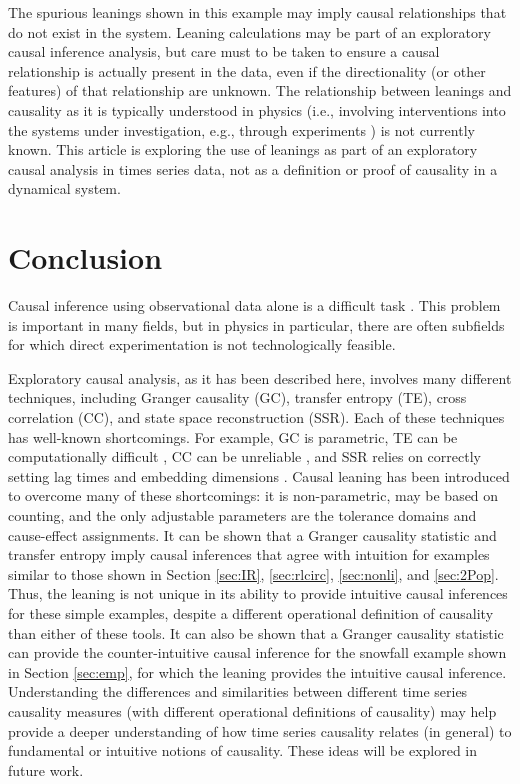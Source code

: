 \documentclass[twocolumn,aps,pre,groupedaddress]{revtex4-1}
\begin{document}
The spurious leanings shown in this example may imply causal relationships that do not exist in the system.  Leaning calculations may be part of an exploratory causal inference analysis, but care must to be taken to ensure a causal relationship is actually present in the data, even if the directionality (or other features) of that relationship are unknown.  The relationship between leanings and causality as it is typically understood in physics (i.e., involving interventions into the systems under investigation, e.g., through experiments \cite{Pearl2000}) is not currently known.  This article is exploring the use of leanings as part of an exploratory causal analysis in times series data, not as a definition or proof of causality in a dynamical system.   

\section{Conclusion}
Causal inference using observational data alone is a difficult task \cite{kleinberg2012}.  This problem is important in many fields, but in physics in particular, there are often subfields for which direct experimentation is not technologically feasible. 

Exploratory causal analysis, as it has been described here, involves many different techniques, including Granger causality (GC), transfer entropy (TE), cross correlation (CC), and state space reconstruction (SSR).  Each of these techniques has well-known shortcomings.  For example, GC is parametric, TE can be computationally difficult \cite{kaiser2002}, CC can be unreliable \cite{Rogosa1980}, and SSR relies on correctly setting lag times and embedding dimensions \cite{Small2004}.  Causal leaning has been introduced to overcome many of these shortcomings: it is non-parametric, may be based on counting, and the only adjustable parameters are the tolerance domains and cause-effect assignments.  It can be shown that a Granger causality statistic and transfer entropy imply causal inferences that agree with intuition for examples similar to those shown in Section \ref{sec:IR}, \ref{sec:rlcirc}, \ref{sec:nonli}, and \ref{sec:2Pop}.  Thus, the leaning is not unique in its ability to provide intuitive causal inferences for these simple examples, despite a different operational definition of causality than either of these tools.  It can also be shown that a Granger causality statistic can provide the counter-intuitive causal inference for the snowfall example shown in Section \ref{sec:emp}, for which the leaning provides the intuitive causal inference.  Understanding the differences and similarities between different time series causality measures (with different operational definitions of causality) may help provide a deeper understanding of how time series causality relates (in general) to fundamental or intuitive notions of causality.  These ideas will be explored in future work.
\end{document}
